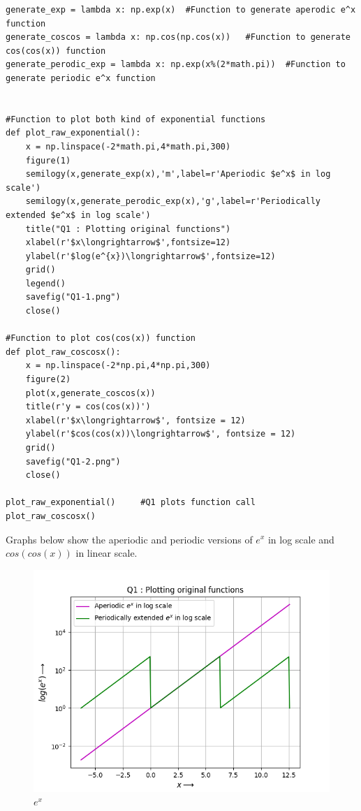 \documentclass[11pt, a4paper]{article}
\begin{document}
\begin{lstlisting}
generate_exp = lambda x: np.exp(x)  #Function to generate aperodic e^x function
generate_coscos = lambda x: np.cos(np.cos(x))   #Function to generate cos(cos(x)) function
generate_perodic_exp = lambda x: np.exp(x%(2*math.pi))  #Function to generate periodic e^x function


#Function to plot both kind of exponential functions
def plot_raw_exponential():
    x = np.linspace(-2*math.pi,4*math.pi,300)     
    figure(1)
    semilogy(x,generate_exp(x),'m',label=r'Aperiodic $e^x$ in log scale')      
    semilogy(x,generate_perodic_exp(x),'g',label=r'Periodically extended $e^x$ in log scale')
    title("Q1 : Plotting original functions")
    xlabel(r'$x\longrightarrow$',fontsize=12)
    ylabel(r'$log(e^{x})\longrightarrow$',fontsize=12)
    grid()
    legend()
    savefig("Q1-1.png")
    close()

#Function to plot cos(cos(x)) function
def plot_raw_coscosx():
    x = np.linspace(-2*np.pi,4*np.pi,300)
    figure(2)
    plot(x,generate_coscos(x))
    title(r'y = cos(cos(x))')
    xlabel(r'$x\longrightarrow$', fontsize = 12)
    ylabel(r'$cos(cos(x))\longrightarrow$', fontsize = 12)
    grid()
    savefig("Q1-2.png")
    close()

plot_raw_exponential()     #Q1 plots function call
plot_raw_coscosx()
\end{lstlisting}
\par  Graphs below show the aperiodic and periodic versions of $e^x$ in log scale and $cos(cos(x))$ in linear scale.

\begin{figure}[!tbh]
    \centering
    \includegraphics[scale = 0.7]{Q1-1.png}
    \caption{$e^x$}
    \label{fig:Figure 1}
\end{figure}
\end{document}
